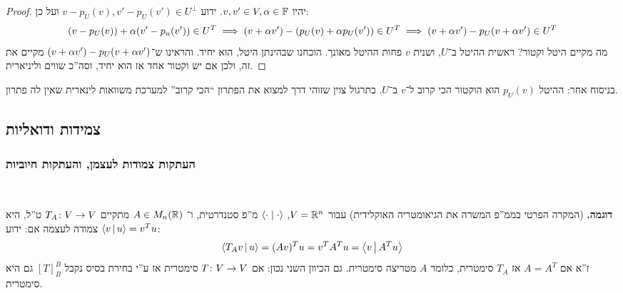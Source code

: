 \documentclass[name=רשימות אלגברה לינארית 2א]{../../../tex/classes/megasumPreamble}
\begin{document}
	\begin{proof}
		יהיו $v, v' \in V, \alpha \in \mathbb{F}$. ידוע $v - p_U(v), v' - p_U(v') \in U^{\perp}$ ועל כן: 
		\[ (v - p_U(v)) + \alpha(v' - p_u(v')) \in U^T \implies (v + \alpha v') - (p_U(v) + \alpha p_U(v')) \in U^T \implies (v + \alpha v') - p_U(v + \alpha v') \in U^{T} \]
		מה מקיים היטל וקטור? ראשית ההיטל ב־$U$, ושנית $v$ פחות ההיטל מאונך. הוכחנו שבהינתן היטל, הוא יחיד. והראינו ש־$(v + \alpha v') - p_U(v + \alpha v')$ מקיים את זה, ולכן אם יש וקטור אחד אז הוא יחיד, וסה''כ שווים וליניארית. 
	\end{proof}
	
	בניסוח אחר: ההיטל $p_U(v)$ הוא הוקטור הכי קרוב ל־$v$ ב־$U$. בתרגול צוין שזוהי דרך למצוא את הפתרון ``הכי קרוב'' למערכת משוואות לינארית שאין לה פתרון. 
	
	
	\subsection{צמידות ודואליות}
	\subsubsection{העתקות צמודות לעצמן, והעתקות חיוביות}\ 
	
	
	\textbf{דוגמה. }(המקרה הפרטי בממ''פ המשרה את הגיאומטריה האוקלידית) עבור $V = \mathbb{R}^{n}$, $\left \langle \cdot \mid \cdot \right \rangle$ מ''פ סטנדרטית, ו־ $A \in M_n(\mathbb{R})$ מתקיים $T_A \colon V \to V$ ט''ל, היא צמודה לעצמה אם: ידוע $\left \langle v \,\middle|\, u \right \rangle = v^{T}u$: 
	\[ \left \langle T_Av \,\middle|\, u \right \rangle = (Av)^{T}u = v^{T}A^Tu = \left \langle v \,\middle|\, A^{T}u \right \rangle \]
	ז''א אם $A = A^{T}$ אז $T_A$ סימטרית, כלומר $A$ מטריצה סימטרית. גם הכיוון השני נכון: אם $T \colon V \to V$ סימטרית אז ע''י בחירת בסיס נקבל $[T]^{B}_B$ גם היא סימטרית. 
	
\end{document}
